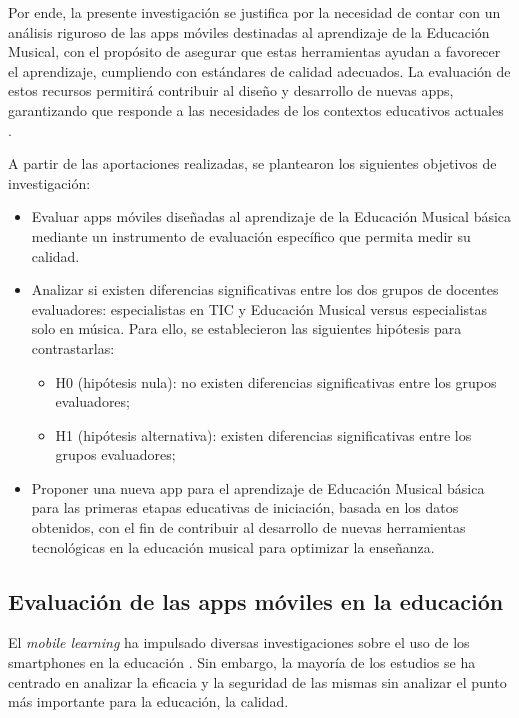 \documentclass[spanish]{textolivre}
\begin{document}
Por ende, la presente investigación se justifica por la necesidad de contar con un análisis riguroso de las apps móviles destinadas al aprendizaje de la Educación Musical, con el propósito de asegurar que estas herramientas ayudan a favorecer el aprendizaje, cumpliendo con estándares de calidad adecuados. La evaluación de estos recursos permitirá contribuir al diseño y desarrollo de nuevas apps, garantizando que responde a las necesidades de los contextos educativos actuales \cite{quezada-bolanos2023}.

A partir de las aportaciones realizadas, se plantearon los siguientes objetivos de investigación: 

\begin{itemize}
  \item Evaluar apps móviles diseñadas al aprendizaje de la Educación Musical básica mediante un instrumento de evaluación específico que permita medir su calidad.
  \item Analizar si existen diferencias significativas entre los dos grupos de docentes evaluadores: especialistas en TIC y Educación Musical versus especialistas solo en música. Para ello, se establecieron las siguientes hipótesis para contrastarlas:
  \begin{itemize}
    \item H0 (hipótesis nula): no existen diferencias significativas entre los grupos evaluadores;
    \item H1 (hipótesis alternativa): existen diferencias significativas entre los grupos evaluadores;
  \end{itemize}
  \item Proponer una nueva app para el aprendizaje de Educación Musical básica para las primeras etapas educativas de iniciación, basada en los datos obtenidos, con el fin de contribuir al desarrollo de nuevas herramientas tecnológicas en la educación musical para optimizar la enseñanza.
\end{itemize}

\subsection{Evaluación de las apps móviles en la educación}\label{sec-normas}
El \textit{mobile learning} ha impulsado diversas investigaciones sobre el uso de los smartphones en la educación \cite{romero-rodriguez2023, lerma-noriega2023}. Sin embargo, la mayoría de los estudios se ha centrado en analizar la eficacia y la seguridad de las mismas sin analizar el punto más importante para la educación, la calidad. 
\end{document}
